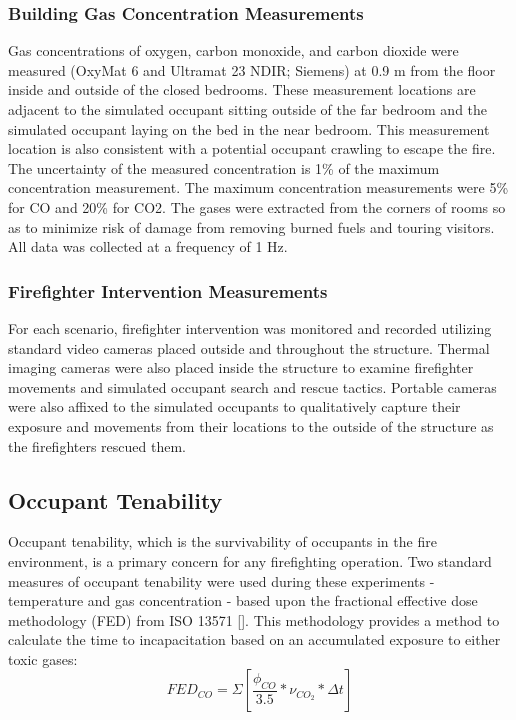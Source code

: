 \documentclass[12pt,oneside]{article}
\begin{document}
\subsubsection{Building Gas Concentration Measurements}
Gas concentrations of oxygen, carbon monoxide, and carbon dioxide were measured (OxyMat 6 and Ultramat 23 NDIR; Siemens) at 0.9 m from the floor inside and outside of the closed bedrooms.   These measurement locations are adjacent to the simulated occupant sitting outside of the far bedroom and the simulated occupant laying on the bed in the near bedroom.  This measurement location is also consistent with a potential occupant crawling to escape the fire.  The uncertainty of the measured concentration is 1\% of the maximum concentration measurement. The maximum concentration measurements were 5\% for CO and 20\% for CO2. The gases were extracted from the corners of rooms so as to minimize risk of damage from removing burned fuels and touring visitors. All data was collected at a frequency of 1 Hz. 

\subsubsection{Firefighter Intervention Measurements}
For each scenario, firefighter intervention was monitored and recorded utilizing standard video cameras placed outside and throughout the structure.  Thermal imaging cameras were also placed inside the structure to examine firefighter movements and simulated occupant search and rescue tactics.  Portable cameras were also affixed to the simulated occupants to qualitatively capture their exposure and movements from their locations to the outside of the structure as the firefighters rescued them.

\subsection{Occupant Tenability}
Occupant tenability, which is the survivability of occupants in the fire environment, is a primary concern for any firefighting operation.  Two standard measures of occupant tenability were used during these experiments - temperature and gas concentration - based upon the fractional effective dose methodology (FED) from ISO 13571 []. This methodology provides a method to calculate the time to incapacitation based on an accumulated exposure to either toxic gases:
\begin{equation}\label{eqn:FED_co}FED_{CO} = \Sigma [\frac{\phi_{CO}}{3.5}*\nu_{CO_2}*\Delta t]\end{equation}
\end{document}
